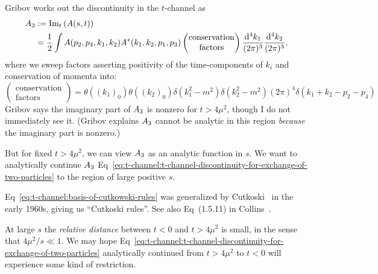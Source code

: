 Gribov works out the discontinuity in the $t$-channel as
\begin{subequations}\label{eq:t-channel:basis-of-cutkowski-rules}
\begin{align}
A_{3} &:= \operatorname{Im}_{t}\left(A(s,t)\right)\\
&=\frac{1}{2}\int A(p_{2},p_{4},k_{1},k_{2})A^{*}(k_{1},k_{2},p_{1},p_{3})
\begin{pmatrix}\mbox{conservation}\\
  \mbox{factors}
\end{pmatrix}
\frac{\mathrm{d}^{4}k_{1}}{(2\pi)^{3}}\frac{\mathrm{d}^{4}k_{2}}{(2\pi)^{3}},\label{eq:t-channel:t-channel-discontinuity-for-exchange-of-two-particles}
\end{align}
\end{subequations}
where we sweep factors asserting positivity of the time-components of
$k_{i}$ and conservation of momenta into:
\begin{equation}
\begin{pmatrix}\mbox{conservation}\\
  \mbox{factors}
\end{pmatrix}
=\theta\left((k_{1})_{0}\right)\theta\left((k_{2})_{0}\right)
\delta(k_{1}^{2}-m^{2})\delta(k_{2}^{2}-m^{2})(2\pi)^{4}\delta(k_{1}+k_{2}-p_{2}-p_{4})
\end{equation}
Gribov says the imaginary part of $A_{3}$ is nonzero for
$t>4\mu^{2}$, though I do not immediately see it. (Gribov explains
$A_{3}$ cannot be analytic in this region \emph{because} the
imaginary part is nonzero.)

But for fixed $t>4\mu^{2}$, we can view $A_{3}$ as an analytic
function in $s$. We want to analytically continue $A_{3}$ Eq~\eqref{eq:t-channel:t-channel-discontinuity-for-exchange-of-two-particles} to
the region of large positive $s$.

\begin{remark}
Eq~\eqref{eq:t-channel:basis-of-cutkowski-rules}
was generalized by Cutkoski~\cite{Cutkosky:1960sp,Cutkosky:1961} in the
early 1960s, giving us ``Cutkoski rules''.
See also Eq~(1.5.11) in Collins~\cite{Collins:1977jy}.
\end{remark}

\M
At large $s$ the \emph{relative distance} between $t<0$ and $t>4\mu^{2}$
is small, in the sense that $4\mu^{2}/s\ll1$. We may hope Eq~\eqref{eq:t-channel:t-channel-discontinuity-for-exchange-of-two-particles}
analytically continued from $t>4\mu^{2}$ to $t<0$ will experience some
kind of restriction.

